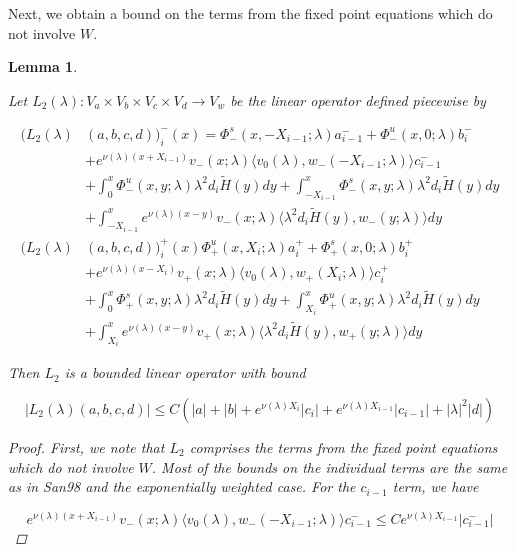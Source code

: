 \documentclass[12pt]{article}
\newtheorem{lemma}{Lemma}
\begin{document}
Next, we obtain a bound on the terms from the fixed point equations which do not involve $W$. 


\begin{lemma}\label{L2}

Let $L_2(\lambda): V_a \times V_b \times V_c \times V_d \rightarrow V_w$ be the linear operator defined piecewise by

\begin{align*}
(L_2(\lambda)&(a,b,c,d))_i^-(x) = \Phi^s_-(x, -X_{i-1}; \lambda)a_{i-1}^- + \Phi^u_-(x, 0; \lambda)b_i^- \\
&+ e^{\nu(\lambda)(x+X_{i-1})} v_-(x; \lambda) \langle v_0(\lambda), w_-(-X_{i-1}; \lambda) \rangle c_{i-1}^- \\
&+ \int_0^x \Phi^u_-(x, y; \lambda)\lambda^2 d_i \tilde{H}(y) dy + \int_{-X_{i-1}}^x \Phi^s_-(x, y; \lambda) \lambda^2 d_i \tilde{H}(y) dy \\
&+ \int_{-X_{i-1}}^x 
e^{\nu(\lambda)(x-y)} v_-(x; \lambda) \langle \lambda^2 d_i \tilde{H}(y), w_-(y; \lambda) \rangle dy \\
(L_2(\lambda)&(a,b,c,d))_i^+(x) \Phi^u_+(x, X_i; \lambda)a_i^+ + \Phi^s_+(x, 0; \lambda)b_i^+ \\
&+ e^{\nu(\lambda)(x - X_i)} v_+(x; \lambda) \langle v_0(\lambda), w_+(X_i; \lambda) \rangle c_i^+ \\
&+ \int_0^x \Phi^s_+(x, y; \lambda) \lambda^2 d_i \tilde{H}(y) dy + \int_{X_i}^x \Phi^u_+(x, y; \lambda) \lambda^2 d_i \tilde{H}(y) dy \\
&+ \int_{X_i}^x e^{\nu(\lambda)(x-y)} v_+(x; \lambda) \langle \lambda^2 d_i \tilde{H}(y), w_+(y; \lambda) \rangle dy
\end{align*}

Then $L_2$ is a bounded linear operator with bound

\begin{equation}\label{L2bound}
|L_2(\lambda)(a,b,c,d)| \leq C (|a| + |b| + e^{\nu(\lambda)X_i}|c_i| + e^{\nu(\lambda)X_{i-1}}|c_{i-1}| + |\lambda|^2 |d| )
\end{equation}

\begin{proof}
First, we note that $L_2$ comprises the terms from the fixed point equations which do not involve $W$. Most of the bounds on the individual terms are the same as in San98 and the exponentially weighted case. For the $c_{i-1}$ term, we have

\[
e^{\nu(\lambda)(x+X_{i-1})} v_-(x; \lambda) \langle v_0(\lambda), w_-(-X_{i-1}; \lambda) \rangle c_{i-1}^- \leq C e^{\nu(\lambda) X_{i-1} }|c_{i-1}^-|
\]


\end{proof}
\end{lemma}
\end{document}
